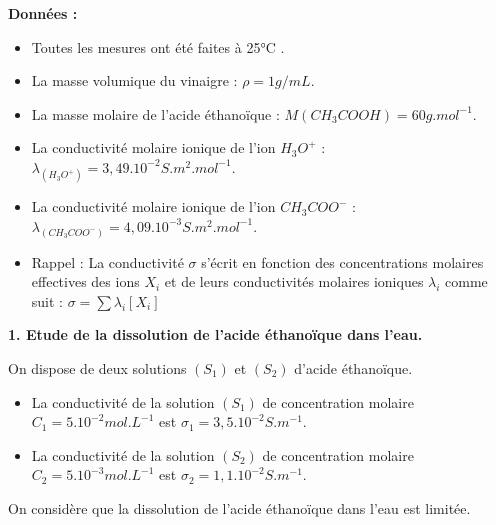 \documentclass[12pt]{article}
\begin{document}
\textbf{Données : }
\begin{itemize}
	\item Toutes les mesures ont été faites à 25°C .
	\item La masse volumique du vinaigre : $\rho = 1 g/mL$.
	\item La masse molaire de l’acide éthanoïque : $M(CH_3COOH) = 60 g.mol^{-1}$.
	\item La conductivité molaire ionique de l’ion $H_3O^+$ : $\lambda_{(H_3O^+)} = 3,49.10^{-2}S.m^2.mol^{-1}$.
	\item La conductivité molaire ionique de l’ion $CH_3COO^-$ : $\lambda_{(CH_3COO^-)} = 4,09.10^{-3}S.m^2.mol^{-1}$.
	\item Rappel : La conductivité $\sigma$ s’écrit en fonction des concentrations molaires effectives
		des ions $X_i$ et de leurs conductivités molaires ioniques $\lambda_i$ comme suit : $\sigma = \sum \lambda_i[X_i]$
\end{itemize}

\hspace{-1cm} \textbf{1. Etude de la dissolution de l’acide éthanoïque dans l’eau. \dotfill}

On dispose de deux solutions $(S_1)$ et $(S_2)$ d’acide éthanoïque.
\begin{itemize}
	\item La conductivité de la solution $(S_1)$ de concentration molaire $C_1 = 5.10^{-2} mol.L^{-1}$ est $\sigma_1 = 3,5.10^{-2}S.m^{-1}$.
	\item La conductivité de la solution $(S_2)$ de concentration molaire $C_2 = 5.10^{-3} mol.L^{-1}$ est $\sigma_2 = 1,1.10^{-2}
		S.m^{-1}$.
\end{itemize}

On considère que la dissolution de l’acide éthanoïque dans l’eau est limitée. 
\end{document}
